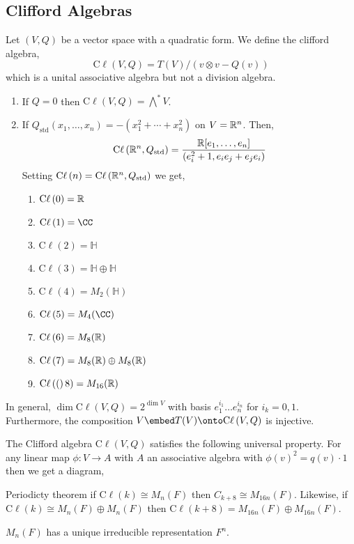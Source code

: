 \documentclass[12pt]{extarticle}
\renewcommand{\H}{\mathbb{H}}
\begin{document}
\subsection{Clifford Algebras}

\newcommand{\Cl}[1]{\mathrm{C}\ell \left( #1 \right)}

\begin{defn}
Let $(V, Q)$ be a vector space with a quadratic form. We define the clifford algebra, 
\[ \Cl{V,Q} = T(V) / (v \otimes v - Q(v)) \] 
which is a unital associative algebra but not a division algebra. 
\end{defn}

\begin{example}
\begin{enumerate}
\item If $Q = 0$ then $\Cl{V, Q} = \bigwedge^{*} V$.
\item If $Q_{\mathrm{std}}(x_1, \dots, x_n) = -(x_1^2 + \cdots + x_n^2)$ on $V = \mathbb{R}^n$. Then,
\[ \Cl{\R^n, Q_{\mathrm{std}}} = \frac{\R[e_1, \dots, e_n]}{(e_i^2 + 1, e_i e_j + e_j e_i)} \] Setting $\Cl{n} = \Cl{\R^n, Q_{\mathrm{std}}}$ we get,
\begin{enumerate}
\item $\Cl{0} = \R$
\item $\Cl{1} = \CC$
\item $\Cl{2} = \H$
\item $\Cl{3} = \H \oplus \H$
\item $\Cl{4} = M_{2}(\H)$
\item $\Cl{5} = M_{4}(\CC)$
\item $\Cl{6} = M_8(\R)$
\item $\Cl{7} = M_8(\R) \oplus M_8(\R)$
\item $\Cl(8) = M_{16}(\R)$
\end{enumerate}
\end{enumerate}
\end{example}

\begin{rmk}
In general, $\dim{\Cl{V,Q}} = 2^{\dim{V}}$ with basis $e_1^{i_1} \dots e_n^{i_n}$ for $i_k = 0,1$. Furthermore, the composition $V \embed T(V) \onto \Cl{V, Q}$ is injective.
\end{rmk}

\begin{prop}
The Clifford algebra $\Cl{V, Q}$ satisfies the following universal property. For any linear map $\phi : V \to A$ with $A$ an associative algebra with $\phi(v)^2 = q(v) \cdot 1$ then we get a diagram,
\begin{center}
\end{center}
\end{prop}

\begin{thm}
Periodicty theorem if $\Cl{k} \cong M_n(F)$ then $C_{k+8} \cong M_{16 n}(F)$. Likewise, if $\Cl{k} \cong M_n(F) \oplus M_n(F)$ then $\Cl{k+8} = M_{16n}(F) \oplus M_{16n}(F)$. 
\end{thm}

\begin{rmk}
$M_n(F)$ has a unique irreducible representation $F^n$. 
\end{rmk}
\end{document}
